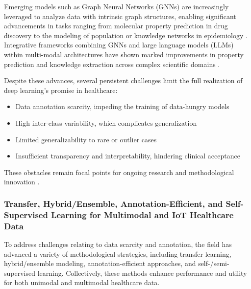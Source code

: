 \documentclass[sigconf]{acmart}
\begin{document}
Emerging models such as Graph Neural Networks (GNNs) are increasingly leveraged to analyze data with intrinsic graph structures, enabling significant advancements in tasks ranging from molecular property prediction in drug discovery to the modeling of population or knowledge networks in epidemiology \cite{ref33, ref35, ref57}. Integrative frameworks combining GNNs and large language models (LLMs) within multi-modal architectures have shown marked improvements in property prediction and knowledge extraction across complex scientific domains \cite{ref33}.

Despite these advances, several persistent challenges limit the full realization of deep learning’s promise in healthcare:
\begin{itemize}
    \item Data annotation scarcity, impeding the training of data-hungry models
    \item High inter-class variability, which complicates generalization
    \item Limited generalizability to rare or outlier cases
    \item Insufficient transparency and interpretability, hindering clinical acceptance
\end{itemize}
These obstacles remain focal points for ongoing research and methodological innovation \cite{ref30, ref41, ref49, ref53, ref54, ref56, ref65, ref71}.

\subsubsection{Transfer, Hybrid/Ensemble, Annotation-Efficient, and Self-Supervised Learning for Multimodal and IoT Healthcare Data}

To address challenges relating to data scarcity and annotation, the field has advanced a variety of methodological strategies, including transfer learning, hybrid/ensemble modeling, annotation-efficient approaches, and self-/semi-supervised learning. Collectively, these methods enhance performance and utility for both unimodal and multimodal healthcare data.
\end{document}
